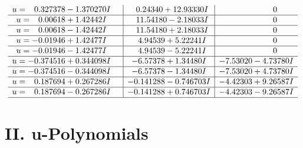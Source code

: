 \documentclass[1p]{elsarticle_modified}
\theoremstyle{definition}
\begin{document}
$$\begin{array}{c|c|c}
\begin{aligned}
u &= \phantom{-}0.327378 - 1.370270 I\end{aligned}
 & \phantom{-}0.24340 + 12.93330 I & \phantom{-0.000000 } 0 \\ \hline\begin{aligned}
u &= \phantom{-}0.00618 + 1.42442 I\end{aligned}
 & \phantom{-}11.54180 - 2.18033 I & \phantom{-0.000000 } 0 \\ \hline\begin{aligned}
u &= \phantom{-}0.00618 - 1.42442 I\end{aligned}
 & \phantom{-}11.54180 + 2.18033 I & \phantom{-0.000000 } 0 \\ \hline\begin{aligned}
u &= -0.01946 + 1.42477 I\end{aligned}
 & \phantom{-}4.94539 + 5.22241 I & \phantom{-0.000000 } 0 \\ \hline\begin{aligned}
u &= -0.01946 - 1.42477 I\end{aligned}
 & \phantom{-}4.94539 - 5.22241 I & \phantom{-0.000000 } 0 \\ \hline\begin{aligned}
u &= -0.374516 + 0.344098 I\end{aligned}
 & -6.57378 + 1.34480 I & -7.53020 - 4.73780 I \\ \hline\begin{aligned}
u &= -0.374516 - 0.344098 I\end{aligned}
 & -6.57378 - 1.34480 I & -7.53020 + 4.73780 I \\ \hline\begin{aligned}
u &= \phantom{-}0.187694 + 0.267286 I\end{aligned}
 & -0.141288 - 0.746703 I & -4.42303 + 9.26587 I \\ \hline\begin{aligned}
u &= \phantom{-}0.187694 - 0.267286 I\end{aligned}
 & -0.141288 + 0.746703 I & -4.42303 - 9.26587 I\\
 \hline 
 \end{array}$$\newpage
\newpage\renewcommand{\arraystretch}{1}
\centering \section*{ II. u-Polynomials}
\end{document}
